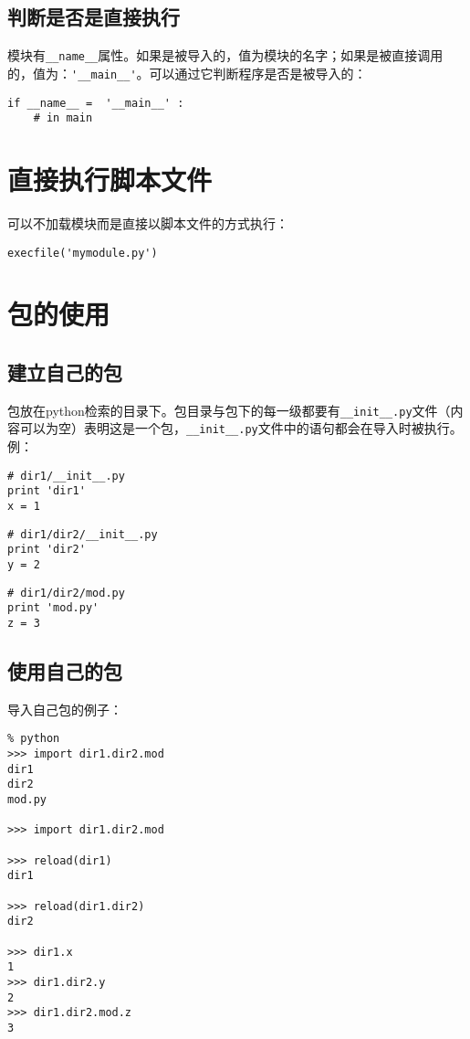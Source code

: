 \subsection{判断是否是直接执行}

模块有\verb|__name__|属性。如果是被导入的，值为模块的名字；如果是被直接调用的，值为：\verb|'__main__'|。可以通过它判断程序是否是被导入的：

\begin{lstlisting}
if __name__ =  '__main__' :
	# in main
\end{lstlisting}

\section{直接执行脚本文件}

可以不加载模块而是直接以脚本文件的方式执行：

\begin{lstlisting}
execfile('mymodule.py')
\end{lstlisting}

\section{包的使用}

\subsection{建立自己的包}

包放在python检索的目录下。包目录与包下的每一级都要有\verb|__init__.py|文件（内容可以为空）表明这是一个包，\verb|__init__.py|文件中的语句都会在导入时被执行。例：

\begin{lstlisting}
# dir1/__init__.py
print 'dir1'
x = 1
\end{lstlisting}

\begin{lstlisting}
# dir1/dir2/__init__.py
print 'dir2'
y = 2
\end{lstlisting}

\begin{lstlisting}
# dir1/dir2/mod.py
print 'mod.py'
z = 3
\end{lstlisting}

\subsection{使用自己的包}

导入自己包的例子：

\begin{lstlisting}
% python
>>> import dir1.dir2.mod
dir1
dir2
mod.py

>>> import dir1.dir2.mod

>>> reload(dir1)
dir1

>>> reload(dir1.dir2)
dir2

>>> dir1.x
1
>>> dir1.dir2.y
2
>>> dir1.dir2.mod.z
3
\end{lstlisting}

